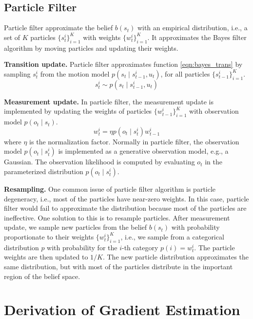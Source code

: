 \documentclass[letterpaper]{article} %
\begin{document}
\subsection{Particle Filter}
Particle filter approximate the belief $b(s_t)$ with an empirical distribution, i.e., a set of $K$ particles $\{s_t^i\}_{i=1}^K$ with weights $\{w_t^i\}_{i=1}^K$. It approximates the Bayes filter algorithm by moving particles and updating their weights.

\textbf{Transition update.} Particle filter approximates function \ref{eqn:bayes_trans} by sampling $s_{t}^i$ from the motion model $p(s_t\mid s_{t-1}^i, u_t)$, for all particles $\{s_{t-1}^i\}_{i=1}^K$. 
\begin{equation}
    s_t^i\sim p(s_t\mid s_{t-1}^i, u_t)
\end{equation}

\textbf{Measurement update.} In particle filter, the measurement update is implemented by updating the weights of particles $\{w_{t-1}^i\}_{i=1}^K$ with observation model $p(o_t\mid s_t)$. 
\begin{equation}
    w_t^i = \eta p(o_t\mid s_t^i) w_{t-1}^i
\end{equation}
where $\eta$ is the normalization factor. Normally in particle filter, the observation model $p(o_t\mid s_t^i)$ is implemented as a generative observation model, e.g., a Gaussian. The observation likelihood is computed by evaluating $o_t$ in the parameterized distribution $p(o_t\mid s_t^i)$.

\textbf{Resampling.} One common issue of particle filter algorithm is particle degeneracy, i.e., most of the particles have near-zero weights. In this case, particle filter would fail to approximate the distribution because most of the particles are ineffective. One solution to this is to resample particles. After measurement update, we sample new particles from the belief $b(s_t)$ with probability proportionate to their weights $\{w_t^i\}_{i=1}^K$, i.e., we sample from a categorical distribution $p$ with probability for the $i$-th category $p(i)=w_t^i$. The particle weights are then updated to $1/K$. The new particle distribution approximates the same distribution, but with most of the particles distribute in the important region of the belief space.

\section{Derivation of Gradient Estimation}\label{sec:grad}
\end{document}
